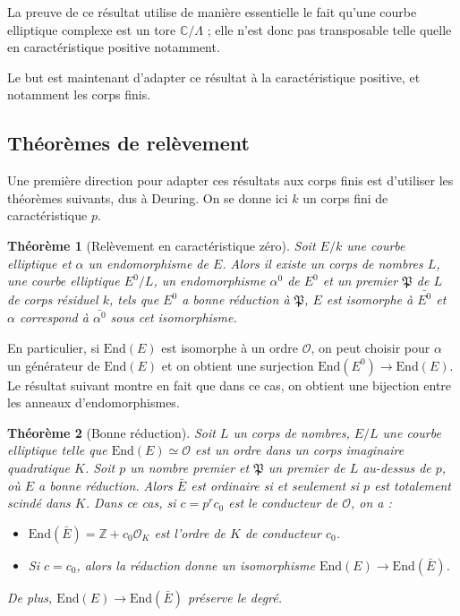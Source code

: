 \documentclass[11pt,a4paper]{article}
\newcommand{\Z}{\mathbb{Z}}
\newcommand{\C}{\mathbb{C}}
\renewcommand{\O}{\mathcal{O}}
\newcommand{\vers}{\rightarrow}
\newcommand{\End}{\mathrm{End}}
\renewcommand{\frak}{\mathfrak}
\newtheorem*{thm}{Théorème}
\theoremstyle{definition}
\begin{document}
La preuve de ce résultat utilise de manière essentielle le fait qu'une courbe elliptique complexe est un tore $\C/\Lambda$ ; elle n'est donc pas transposable telle quelle en caractéristique positive notamment.

Le but est maintenant d'adapter ce résultat à la caractéristique positive, et notamment les corps finis.




\subsection{Théorèmes de relèvement}


Une première direction pour adapter ces résultats aux corps finis est d'utiliser les théorèmes suivants, dus à Deuring. On se donne ici $k$ un corps fini de caractéristique $p$.


\begin{thm}[Relèvement en caractéristique zéro]

Soit $E/k$ une courbe elliptique et $\alpha$ un endomorphisme de $E$. Alors il existe un corps de nombres $L$, une courbe elliptique $E^0/L$, un endomorphisme $\alpha^0$ de $E^0$ et un premier $\frak P$ de $L$ de corps résiduel $k$, tels que $E^0$ a bonne réduction à $\frak P$, $E$ est isomorphe à $\bar{E^0}$ et $\alpha$ correspond à $\bar{\alpha^0}$ sous cet isomorphisme.

\end{thm}

En particulier, si $\End(E)$ est isomorphe à un ordre $\O$, on peut choisir pour $\alpha$ un générateur de $\End(E)$ et on obtient une surjection $\End(E^0)\vers \End(E).$ Le résultat suivant montre en fait que dans ce cas, on obtient une bijection entre les anneaux d'endomorphismes.

\begin{thm}[Bonne réduction]

Soit $L$ un corps de nombres, $E/L$ une courbe elliptique telle que $\End(E)\simeq \O$ est un ordre dans un corps imaginaire quadratique $K$. Soit $p$ un nombre premier et $\frak P$ un premier de $L$ au-dessus de $p$, où $E$ a bonne réduction. Alors $\bar{E}$ est ordinaire si et seulement si $p$ est totalement scindé dans $K$. Dans ce cas, si $c=p^r c_0$ est le conducteur de $\O$, on a :

\begin{itemize}
\item[(i)] $\End(\bar{E})=\Z+c_0 \O_K$ est l'ordre de $K$ de conducteur $c_0$.
\item[(ii)] Si $c=c_0$, alors la réduction donne un isomorphisme $\End(E)\vers\End(\bar{E})$.
\end{itemize}

De plus, $\End(E)\vers\End(\bar{E})$ préserve le degré.

\end{thm}
\end{document}
